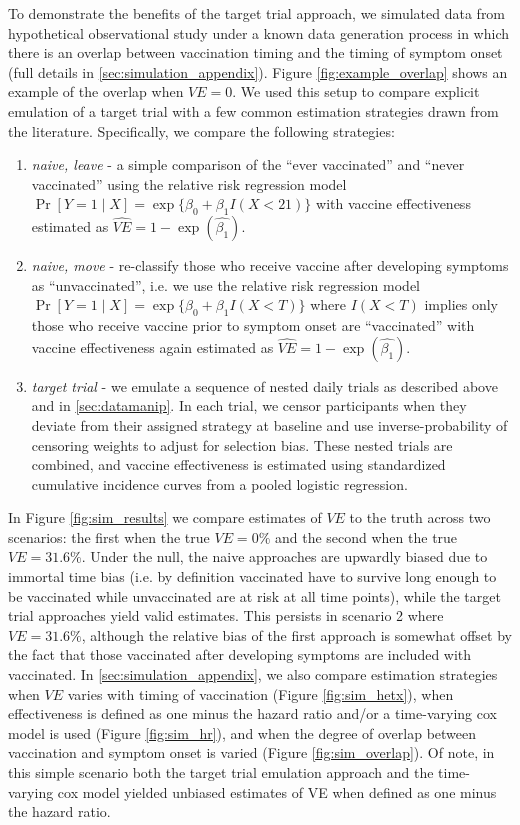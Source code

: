 \documentclass[11pt]{article}
\begin{document}
To demonstrate the benefits of the target trial approach, we simulated data from hypothetical observational study under a known data generation process in which there is an overlap between vaccination timing and the timing of symptom onset (full details in \ref{sec:simulation_appendix}). Figure \ref{fig:example_overlap} shows an example of the overlap when $VE = 0$. We used this setup to compare explicit emulation of a target trial with a few common estimation strategies drawn from the literature. Specifically, we compare the following strategies:
    \begin{enumerate}
        \item \textit{naive, leave} - a simple comparison of the ``ever vaccinated'' and ``never vaccinated'' using the relative risk regression model $\Pr[Y = 1 \mid X] = \operatorname{exp}\{\beta_0 + \beta_1 I(X < 21)\}$ with vaccine effectiveness estimated as $\widehat{VE} = 1 - \exp(\widehat{\beta_1})$.
        \item \textit{naive, move} - re-classify those who receive vaccine after developing symptoms  as ``unvaccinated'', i.e. we use the relative risk regression model $\Pr[Y = 1 \mid X] = \operatorname{exp}\{\beta_0 + \beta_1 I(X < T)\}$ where $I(X<T)$ implies only those who receive vaccine prior to symptom onset are ``vaccinated'' with vaccine effectiveness again estimated as $\widehat{VE} = 1 - \exp(\widehat{\beta_1})$.
        \item \textit{target trial} - we emulate a sequence of nested daily trials as described above and in  \ref{sec:datamanip}. In each trial, we censor participants when they deviate from their assigned strategy at baseline and use inverse-probability of censoring weights to adjust for selection bias. These nested trials are combined, and vaccine effectiveness is estimated using standardized cumulative incidence curves from a pooled logistic regression.
    \end{enumerate}
    
In Figure \ref{fig:sim_results} we compare estimates of $VE$ to the truth across two scenarios: the first when the true $VE = 0\%$ and the second when the true $VE = 31.6\%$. Under the null, the naive approaches are upwardly biased due to immortal time bias (i.e. by definition vaccinated have to survive long enough to be vaccinated while unvaccinated are at risk at all time points), while the target trial approaches yield valid estimates. This persists in scenario 2 where $VE = 31.6\%$, although the relative bias of the first approach is somewhat offset by the fact that those vaccinated after developing symptoms are included with vaccinated. In \ref{sec:simulation_appendix}, we also compare estimation strategies when $VE$ varies with timing of vaccination (Figure \ref{fig:sim_hetx}), when effectiveness is defined as one minus the hazard ratio and/or a time-varying cox model is used (Figure \ref{fig:sim_hr}), and when the degree of overlap between vaccination and symptom onset is varied (Figure \ref{fig:sim_overlap}). Of note, in this simple scenario both the target trial emulation approach and the time-varying cox model yielded unbiased estimates of VE when defined as one minus the hazard ratio.
\end{document}
